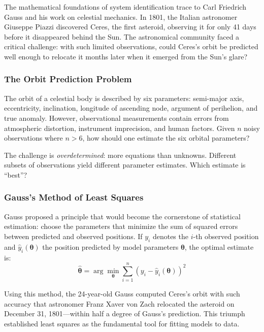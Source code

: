The mathematical foundations of system identification trace to Carl Friedrich Gauss and his work on celestial mechanics. In 1801, the Italian astronomer Giuseppe Piazzi discovered Ceres, the first asteroid, observing it for only 41 days before it disappeared behind the Sun. The astronomical community faced a critical challenge: with such limited observations, could Ceres's orbit be predicted well enough to relocate it months later when it emerged from the Sun's glare?

\subsubsection{The Orbit Prediction Problem}

The orbit of a celestial body is described by six parameters: semi-major axis, eccentricity, inclination, longitude of ascending node, argument of perihelion, and true anomaly. However, observational measurements contain errors from atmospheric distortion, instrument imprecision, and human factors. Given $n$ noisy observations where $n > 6$, how should one estimate the six orbital parameters?

The challenge is \textit{overdetermined}: more equations than unknowns. Different subsets of observations yield different parameter estimates. Which estimate is ``best''?

\subsubsection{Gauss's Method of Least Squares}

Gauss proposed a principle that would become the cornerstone of statistical estimation: choose the parameters that minimize the sum of squared errors between predicted and observed positions. If $y_i$ denotes the $i$-th observed position and $\hat{y}_i(\boldsymbol{\theta})$ the position predicted by model parameters $\boldsymbol{\theta}$, the optimal estimate is:
\begin{equation}
\hat{\boldsymbol{\theta}} = \arg\min_{\boldsymbol{\theta}} \sum_{i=1}^{n} \left( y_i - \hat{y}_i(\boldsymbol{\theta}) \right)^2
\label{eq:gauss_ls}
\end{equation}

Using this method, the 24-year-old Gauss computed Ceres's orbit with such accuracy that astronomer Franz Xaver von Zach relocated the asteroid on December 31, 1801---within half a degree of Gauss's prediction. This triumph established least squares as the fundamental tool for fitting models to data.

